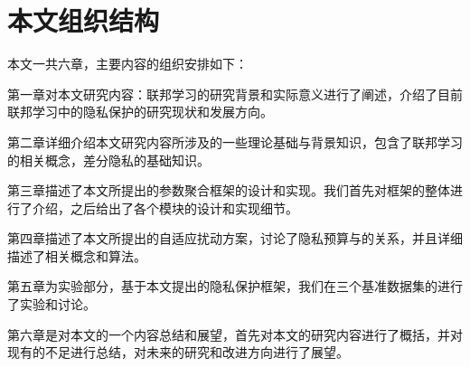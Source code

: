 \section{本文组织结构}

本文一共六章，主要内容的组织安排如下：

第一章对本文研究内容：联邦学习的研究背景和实际意义进行了阐述，介绍了目前联邦学习中的隐私保护的研究现状和发展方向。

第二章详细介绍本文研究内容所涉及的一些理论基础与背景知识，包含了联邦学习的相关概念，差分隐私的基础知识。

第三章描述了本文所提出的参数聚合框架的设计和实现。我们首先对框架的整体进行了介绍，之后给出了各个模块的设计和实现细节。
  
第四章描述了本文所提出的自适应扰动方案，讨论了隐私预算与的关系，并且详细描述了相关概念和算法。
    
第五章为实验部分，基于本文提出的隐私保护框架，我们在三个基准数据集的进行了实验和讨论。

第六章是对本文的一个内容总结和展望，首先对本文的研究内容进行了概括，并对现有的不足进行总结，对未来的研究和改进方向进行了展望。


